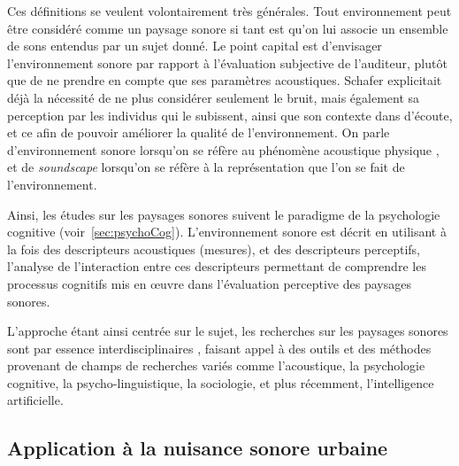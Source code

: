 Ces définitions se veulent volontairement très générales. Tout environnement peut être considéré comme un paysage sonore si tant est qu'on lui associe un ensemble de sons entendus par un sujet donné. Le point capital est d'envisager l’environnement sonore par rapport à l'évaluation subjective de l'auditeur, plutôt que de ne prendre en compte que ses paramètres acoustiques. Schafer explicitait déjà la nécessité de ne plus considérer seulement le bruit, mais également sa perception par les individus qui le subissent, ainsi que son contexte dans d'écoute, et ce afin de pouvoir améliorer la qualité de l'environnement. On parle d'environnement sonore lorsqu'on se réfère au phénomène acoustique physique , et de \emph{soundscape} lorsqu'on se réfère à la représentation que l'on se fait de l'environnement.

Ainsi, les études sur les paysages sonores suivent le paradigme de la psychologie cognitive \citep{dubois2006cognitive,maffiolo_caracterisation_1999} (voir~\ref{sec:psychoCog}). L'environnement sonore est décrit en utilisant à la fois des descripteurs acoustiques (mesures), et des descripteurs perceptifs, l'analyse de l'interaction entre ces descripteurs permettant de comprendre les processus cognitifs mis en œuvre dans l'évaluation perceptive des paysages sonores.

L'approche étant ainsi centrée sur le sujet, les recherches sur les paysages sonores sont par essence interdisciplinaires \citep{davies2013perception,aletta2016soundscape}, faisant appel à des outils et des méthodes provenant de champs de recherches variés comme l'acoustique, la psychologie cognitive, la psycho-linguistique, la sociologie, et plus récemment, l’intelligence artificielle.

\subsection{Application à la nuisance sonore urbaine}

